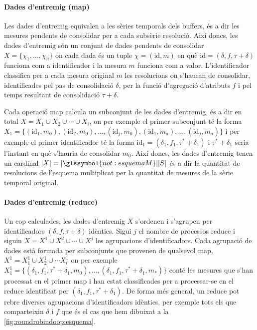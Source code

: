 \paragraph{Dades d'entremig (map)}
Les dades d'entremig equivalen a les sèries temporals dels buffers, és
a dir les mesures pendents de consolidar per a cada subsèrie
resolució.  Així doncs, les dades d'entremig són un conjunt de dades
pendents de consolidar $X=\{ \chi_{1}, \dotsc, \chi_n\}$ on cada dada
és un tuple $\chi=(\text{id},m)$ en què
$\text{id}=(\delta,f,\tau+\delta)$ funciona com a identificador i la
mesura $m$ funciona com a valor. L'identificador classifica per a cada
mesura original $m$ les resolucions on s'hauran de consolidar,
identificades pel pas de consolidació $\delta$, per la funció
d'agregació d'atributs $f$ i pel temps resultant de consolidació
$\tau+\delta$.


Cada operació map calcula un subconjunt de les dades d'entremig, és a
dir en total $X=X_1\cup X_2 \cup \dotsb \cup X_i$, on per exemple el
primer subconjunt té la forma $X_1= \{
(\text{id}_1,m_0),(\text{id}_2,m_0),\dotsc,(\text{id}_j,m_0),(\text{id}_1,m_a),\dotsc,(\text{id}_j,m_a)\}$
i per exemple el primer identificador té la forma
$\text{id}_1=(\delta_1,f_1,\tau^*+\delta_1)$ i $\tau^*+\delta_1$ seria
l'instant en què s'hauria de consolidar $m_0$. %
Així doncs, les dades d'entremig tenen un cardinal
$|X|=|\glssymbol{not:esquemaM}||S|$ és a dir la quantitat de
resolucions de l'esquema multiplicat per la quantitat de mesures de la
sèrie temporal original.



\paragraph{Dades d'entremig (reduce)}
Un cop calculades, les dades d'entremig $X$ s'ordenen i s'agrupen per
identificadors $(\delta,f, \tau+\delta)$ idèntics.  Sigui $j$ el
nombre de processos reduce i siguin $X=X^1\cup X^2 \cup \dotsb \cup
X^j$ les agrupacions d'identificadors.  
 Cada agrupació de dades està
formada per subconjunts que provenen de qualsevol map, $X^1 = X_1^1
\cup X_2^1 \cup \dotsb X_i^1$ on per exemple $X_1^1 = \{
(\delta_1,f_1,\tau^*+\delta_1,m_0), \dotsc
,(\delta_1,f_1,\tau^*+\delta_1,m_*) \} $ conté les mesures que s'han
processat en el primer map i han estat classificades per a
processar-se en el reduce identificat per
$(\delta_1,f_1,\tau^*+\delta_1)$.  
%
De forma més general, un reduce pot rebre diverses agrupacions
d'identificadors idèntics, per exemple tots els que comparteixin
$\delta$ i $f$ que és el cas que hem dibuixat a la
\autoref{fig:roundrobindoop:esquema}.





